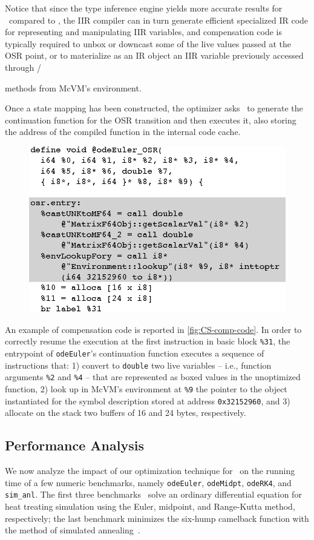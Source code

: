 Notice that since the type inference engine yields more accurate results for \fOptIIR\ compared to \fIIR, the IIR compiler can in turn generate efficient specialized IR code for representing and manipulating IIR variables, and compensation code is typically required to unbox or downcast some of the live values passed at the OSR point, or to materialize as an IR object an IIR variable previously accessed through /{ methods from McVM's environment.

Once a state mapping has been constructed, the optimizer asks \osrkit\ to generate the continuation function for the OSR transition and then executes it, also storing the address of the compiled function in the internal code cache.

\ifdefined\noauthorea
\begin{figure}[!ht]
\begin{center}
\includegraphics[width=0.7\columnwidth]{figures/CS-comp-code/CS-comp-code.eps}
\caption{\protect}
\end{center}
\end{figure}
\fi

\noindent An example of compensation code is reported in \myfigure\ref{fig:CS-comp-code}. In order to correctly resume the execution at the first instruction in basic block {\tt \%31}, the entrypoint of {\tt odeEuler}'s continuation function executes a sequence of instructions that: 1) convert to {\tt double} two live variables -- i.e., function arguments {\tt \%2} and {\tt \%4} -- that are represented as boxed values in the unoptimized function, 2) look up in McVM's environment at {\tt \%9} the pointer to the object instantiated for the symbol description stored at address {\tt 0x32152960}, and 3) allocate on the stack two buffers of 16 and 24 bytes, respectively.

\subsection{Performance Analysis}
We now analyze the impact of our optimization technique for \feval\ on the running time of a few numeric benchmarks, namely {\tt odeEuler}, {\tt odeMidpt}, {\tt odeRK4}, and {\tt sim\_anl}. The first three benchmarks~\cite{Recktenwald2000} solve an ordinary differential equation for heat treating simulation using the Euler, midpoint, and Range-Kutta method, respectively; the last benchmark minimizes the six-hump camelback function with the method of simulated annealing~\cite{simanl}.

}
